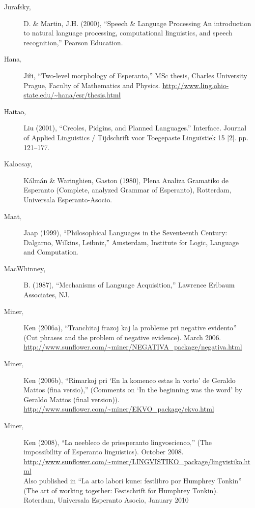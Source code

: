 \documentclass[10pt,a4paper]{article}
\begin{document}
\begin{description}
\item[Jurafsky,] D. \& Martin, J.H. (2000), ``Speech \& Language Processing An
introduction to natural language processing, computational linguistics, and
speech recognition,'' Pearson Education.

\item[Hana,] Ji\~ri, ``Two-level morphology of Esperanto,'' MSc thesis, Charles
University Prague, Faculty of Mathematics and Physics.
\url{http://www.ling.ohio-state.edu/~hana/esr/thesis.html}

\item[Haitao,] Liu (2001), ``Creoles, Pidgins, and Planned Languages.'' Interface.
Journal of Applied Linguistics / Tijdschrift voor Toegepaste Linguïstiek 15 [2]. pp. 121--177.

\item[Kalocsay,] K\'alm\'an \& Waringhien, Gaston (1980), Plena Analiza Gramatiko de
Esperanto (Complete, analyzed Grammar of Esperanto), Rotterdam, Universala
Esperanto-Asocio.

\item[Maat,] Jaap (1999), ``Philosophical Languages in the Seventeenth Century:
Dalgarno, Wilkins, Leibniz,'' Amsterdam, Institute for Logic, Language and
Computation.

\item[MacWhinney,] B. (1987), ``Mechanisms of Language Acquisition,'' Lawrence Erlbaum Associates, NJ.

\item[Miner,] Ken (2006a), ``Tranchitaj frazoj kaj la probleme pri negative
evidento'' (Cut phrases and the problem of negative evidence). March 2006. \\
\url{http://www.sunflower.com/~miner/NEGATIVA_package/negativa.html}

\item[Miner,] Ken (2006b), ``Rimarkoj pri `En la komenco estas la vorto' de Geraldo
Mattos (fina versio),'' (Comments on `In the beginning was the word' by Geraldo
Mattos (final version)). \\
\url{http://www.sunflower.com/~miner/EKVO_package/ekvo.html}

\item[Miner,] Ken (2008), ``La neebleco de priesperanto lingvoscienco,'' (The
impossibility of Esperanto linguistics). October 2008. \\
\url{http://www.sunflower.com/~miner/LINGVISTIKO_package/lingvistiko.html} \\
Also published in ``La arto labori kune: festlibro por Humphrey Tonkin'' (The
art of working together: Festschrift for Humphrey Tonkin). Roterdam, Universala
Esperanto Asocio, January 2010


\end{description}
\end{document}

